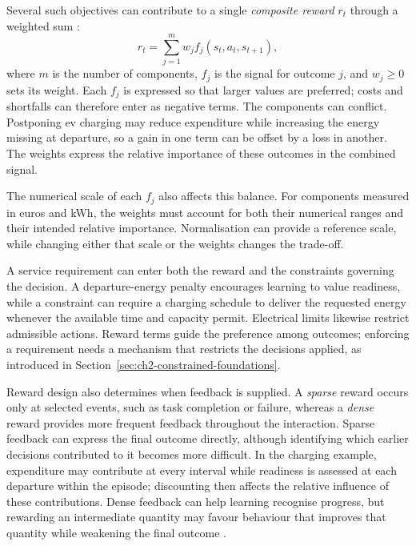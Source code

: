 Several such objectives can contribute to a single \emph{composite reward} $r_t$ through a weighted sum \parencite{roijers2013multiobjective}:
\begin{equation}
r_t=\sum_{j=1}^{m} w_j f_j(s_t,a_t,s_{t+1}),
\label{eq:ch2-composite-reward}
\end{equation}
where $m$ is the number of components, $f_j$ is the signal for outcome $j$, and $w_j\geq 0$ sets its weight. Each $f_j$ is expressed so that larger values are preferred; costs and shortfalls can therefore enter as negative terms. The components can conflict. Postponing \gls{ev} charging may reduce expenditure while increasing the energy missing at departure, so a gain in one term can be offset by a loss in another. The weights express the relative importance of these outcomes in the combined signal.

The numerical scale of each $f_j$ also affects this balance. For components measured in euros and kWh, the weights must account for both their numerical ranges and their intended relative importance. Normalisation can provide a reference scale, while changing either that scale or the weights changes the trade-off.

A service requirement can enter both the reward and the constraints governing the decision. A departure-energy penalty encourages learning to value readiness, while a constraint can require a charging schedule to deliver the requested energy whenever the available time and capacity permit. Electrical limits likewise restrict admissible actions. Reward terms guide the preference among outcomes; enforcing a requirement needs a mechanism that restricts the decisions applied, as introduced in Section~\ref{sec:ch2-constrained-foundations}.

Reward design also determines when feedback is supplied. A \emph{sparse} reward occurs only at selected events, such as task completion or failure, whereas a \emph{dense} reward provides more frequent feedback throughout the interaction. Sparse feedback can express the final outcome directly, although identifying which earlier decisions contributed to it becomes more difficult. In the charging example, expenditure may contribute at every interval while readiness is assessed at each departure within the episode; discounting then affects the relative influence of these contributions. Dense feedback can help learning recognise progress, but rewarding an intermediate quantity may favour behaviour that improves that quantity while weakening the final outcome \parencite{sutton2018rl}.

